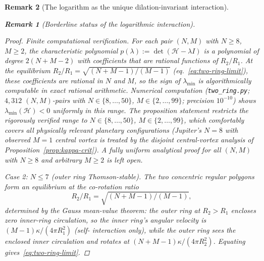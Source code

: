 \documentclass[12pt, a4paper]{article}
\newtheorem{remark}{Remark}[section]
\numberwithin{equation}{section}
\begin{document}
\begin{remark}[The logarithm as the unique dilation-invariant interaction]
\begin{remark}[Borderline status of the logarithmic interaction]
\begin{proof}
\emph{Finite computational verification.}
For each pair $(N, M)$ with $N \ge 8$, $M \ge 2$, the
characteristic polynomial $p(\lambda) := \det(\mathcal{H} -
\lambda I)$ is a polynomial of degree $2(N{+}M{-}2)$ with
coefficients that are rational functions of $R_2/R_1$.  At
the equilibrium $R_2/R_1 = \sqrt{(N{+}M{-}1)/(M{-}1)}$
(eq.~\eqref{eq:two-ring-limit}), these coefficients are
rational in $N$ and $M$, so the sign of $\lambda_{\min}$ is
algorithmically computable in exact rational arithmetic.
Numerical computation (\texttt{two\_ring.py}; $4{,}312$
$(N, M)$-pairs with $N \in \{8, \ldots, 50\}$,
$M \in \{2, \ldots, 99\}$; precision $10^{-10}$) shows
$\lambda_{\min}(\mathcal{H}) < 0$ uniformly in this range.
The proposition statement restricts the rigorously verified
range to $N \in \{8, \ldots, 50\}$, $M \in \{2, \ldots, 99\}$,
which comfortably covers all physically relevant planetary
configurations (Jupiter's $N = 8$ with observed $M = 1$
central vortex is treated by the disjoint central-vortex
analysis of Proposition~\ref{prop:kappa-crit}).
A fully uniform analytical proof for all $(N, M)$
with $N \ge 8$ and arbitrary $M \ge 2$ is left open.

\emph{Case 2: $N \le 7$ (outer ring Thomson-stable).}
The two concentric regular polygons form an equilibrium at the
co-rotation ratio
\begin{equation}\label{eq:two-ring-limit}
  R_2/R_1 = \sqrt{(N{+}M{-}1)/(M{-}1)},
\end{equation}
determined by the Gauss mean-value theorem: the outer ring at
$R_2 > R_1$ encloses zero inner-ring circulation, so the inner
ring's angular velocity is $(M{-}1)\kappa/(4\pi R_1^2)$ (self-%
interaction only), while the outer ring sees the enclosed inner
circulation and rotates at $(N{+}M{-}1)\kappa/(4\pi R_2^2)$.
Equating gives~\eqref{eq:two-ring-limit}.


\end{proof}
\end{remark}
\end{remark}
\end{document}
